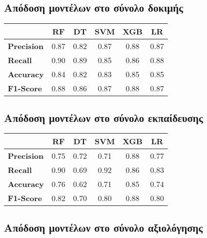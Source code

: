 \documentclass[diploma]{softlab-thesis}
\begin{document}
\begin{enumerate}
\begin{enumerate}
\subsection{Απόδοση μοντέλων στο σύνολο δοκιμής}

\begin{table}[H]
\centering
\begin{tabular}{|l|c|c|c|c|c|}
\hline
       & \textbf{RF} & \textbf{DT} & \textbf{SVM} & \textbf{XGB} & \textbf{LR} \\ \hline
\textbf{Precision} & 0.87        & 0.82       & 0.87         & 0.88         & 0.87       \\ \hline
\textbf{Recall}    & 0.90        & 0.89        & 0.85         & 0.86         & 0.88        \\ \hline
\textbf{Accuracy}  & 0.84        & 0.82        & 0.83         & 0.85         & 0.85 \\ \hline
\textbf{F1-Score}  & 0.88        & 0.86       & 0.87         & 0.88         & 0.87       \\ \hline
\end{tabular}
\end{table}

\subsection{Απόδοση μοντέλων στο σύνολο εκπαίδευσης}

\begin{table}[H]
\centering
\begin{tabular}{|l|c|c|c|c|c|}
\hline
       & \textbf{RF} & \textbf{DT} & \textbf{SVM} & \textbf{XGB} & \textbf{LR} \\ \hline
\textbf{Precision} & 0.75        & 0.72        & 0.71         & 0.88         & 0.77        \\ \hline
\textbf{Recall}    & 0.90        & 0.69        & 0.92         & 0.86        & 0.83        \\ \hline
\textbf{Accuracy}  & 0.76        & 0.62        & 0.71         & 0.85         & 0.74        \\ \hline
\textbf{F1-Score}  & 0.82        & 0.70        & 0.80         & 0.88         & 0.80        \\ \hline
\end{tabular}
\end{table}

\subsection{Απόδοση μοντέλων στο σύνολο αξιολόγησης}


\end{enumerate}
\end{enumerate}
\end{document}
